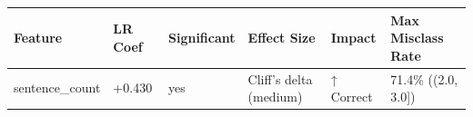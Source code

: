 \begin{tabular}{llllll}
\toprule
Feature & LR Coef & Significant & Effect Size & Impact & Max Misclass Rate \\
\midrule
sentence\_count & +0.430 & yes & Cliff's delta (medium) & ↑ Correct & 71.4\% ((2.0, 3.0]) \\
\bottomrule
\end{tabular}
